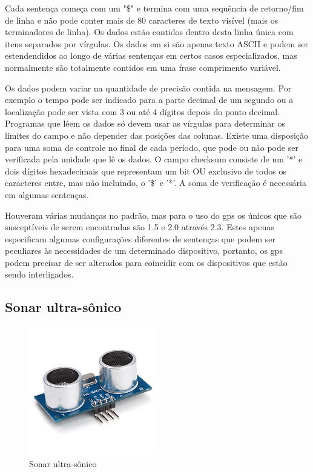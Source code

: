\documentclass[final,12pt, times, 5p, twocolumn]{elsarticle}
\begin{document}
Cada sentença começa com um "\$" e termina com uma sequência de retorno/fim de linha e não pode conter mais de 80 caracteres de texto visível (mais os terminadores de linha). Os dados estão contidos dentro desta linha única com itens separados por vírgulas. Os dados em si são apenas texto ASCII e podem ser estendendidos ao longo de várias sentenças em certos casos especializados, mas normalmente são totalmente contidos em uma frase comprimento variável.

Os dados podem variar na quantidade de precisão contida na mensagem. Por exemplo o tempo pode ser indicado para a parte decimal de um segundo ou a localização pode ser vista com 3 ou até 4 dígitos depois do ponto decimal. Programas que lêem os dados só devem usar as vírgulas para determinar os limites do campo e não depender das posições das colunas. Existe uma disposição para uma soma de controle no final de cada período, que pode ou não pode ser verificada pela unidade que lê os dados. O campo checksum consiste de um '*' e dois dígitos hexadecimais que representam um bit OU exclusivo de todos os caracteres entre, mas não incluindo, o '\$' e '*'. A soma de verificação é necessária em algumas sentenças.

Houveram várias mudanças no padrão, mas para o uso do gps os únicos que são susceptíveis de serem encontradas são 1.5 e 2.0 através 2.3. Estes apenas especificam algumas configurações diferentes de sentenças que podem ser peculiares às necessidades de um determinado dispositivo, portanto, os gps podem precisar de ser alterados para coincidir com os dispositivos que estão sendo interligados. 

\subsection{Sonar ultra-sônico}

\begin{figure}[ht!]
\centering
\includegraphics[width=0.5\textwidth]{ultrasom.jpg}
\caption{\label{fig:ultrasom}Sonar ultra-sônico}
\end{figure}
\end{document}
